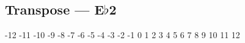 \subsection[Transpose]{Transpose --- \UiKey{\SET}E$\flat$2}





























-12
-11
-10
-9
-8
-7
-6
-5
-4
-3
-2
-1
0
1
2
3
4
5
6
7
8
9
10
11
12
